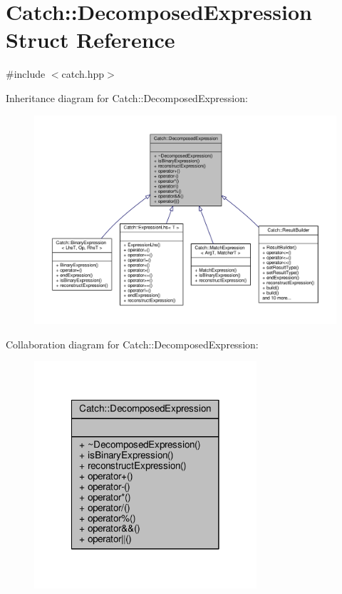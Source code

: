 \hypertarget{struct_catch_1_1_decomposed_expression}{\section{Catch\-:\-:Decomposed\-Expression Struct Reference}
\label{struct_catch_1_1_decomposed_expression}
}


{\ttfamily \#include $<$catch.\-hpp$>$}



Inheritance diagram for Catch\-:\-:Decomposed\-Expression\-:
\nopagebreak
\begin{figure}[H]
\begin{center}
\leavevmode
\includegraphics[width=350pt]{struct_catch_1_1_decomposed_expression__inherit__graph}
\end{center}
\end{figure}


Collaboration diagram for Catch\-:\-:Decomposed\-Expression\-:
\nopagebreak
\begin{figure}[H]
\begin{center}
\leavevmode
\includegraphics[width=234pt]{struct_catch_1_1_decomposed_expression__coll__graph}
\end{center}
\end{figure}
